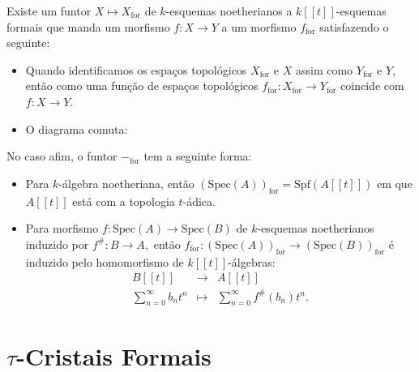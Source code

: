 \documentclass[11pt,twoside,a4paper]{book}
\begin{document}
\begin{lema}
Existe um funtor $X\mapsto X_{\mathrm{for}}$ de $k$-esquemas noetherianos a $k[[t]]$-esquemas formais que manda um morfismo $f:X\rightarrow Y$ a um morfismo $f_{\mathrm{for}}$ satisfazendo o seguinte:
\begin{itemize}
\item Quando identificamos os espaços topológicos $X_\mathrm{for}$ e $X$ assim como $Y_\mathrm{for}$ e $Y$, então como uma função de espaços topológicos $f_{\mathrm{for}}:X_{\mathrm{for}}\rightarrow Y_{\mathrm{for}}$ coincide com $f:X\rightarrow Y.$
\item O diagrama comuta:
\begin{center}
\end{center}
\end{itemize}
\end{lema}

\begin{lema}
No caso afim, o funtor $-_\mathrm{for}$ tem a seguinte forma:
\begin{itemize}
    \item Para $k$-álgebra noetheriana, então $(\mathrm{Spec}(A))_{\mathrm{for}}=\mathrm{Spf}(A[[t]])$ em que $A[[t]]$ está com a topologia $t$-ádica.
    \item Para morfismo $f:\mathrm{Spec}(A)\rightarrow\mathrm{Spec}(B)$ de $k$-esquemas noetherianos induzido por $f^{\#}:B\rightarrow A,$ então $f_\mathrm{for}:(\mathrm{Spec}(A))_\mathrm{for}\rightarrow(\mathrm{Spec}(B))_\mathrm{for}$ é induzido pelo homomorfismo de $k[[t]]$-álgebras:
    \[
    \begin{array}{rcl}
        B[[t]] &\rightarrow& A[[t]] \\
        \sum\limits_{n=0}^\infty b_nt^n&\mapsto& \sum\limits_{n=0}^\infty f^{\#}(b_n)t^n.
    \end{array}
    \]
\end{itemize}
\end{lema}

\chapter{$\tau$-Cristais Formais}
\end{document}
